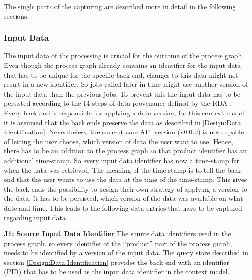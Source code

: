 \documentclass[draft,final]{vutinfth} %
\begin{document}
The single parts of the capturing are described more in detail in the following sections. 

\subsubsection{Input Data}\label{Design:Input Data}
The input data of the processing is crucial for the outcome of the process graph. Even though the process graph already contains an identifier for the input data that has to be unique for the specific back end, changes to this data might not result in a new identifier. So jobs called later in time might use another version of the input data than the previous jobs. To prevent this the input data has to be persisted according to the 14 steps of data provenance defined by the RDA \cite{rauber2016identification}. Every back end is responsible for applying a data version, for this context model it is assumed that the back ends preserve the data as described in \ref{Design:Data Identification}. Nevertheless, the current core API version (v0.0.2) is not capable of letting the user choose, which version of data the user want to use. Hence, there has to be an addition to the process graph so that product identifier has an additional time-stamp. So every input data identifier has now a time-stamp for when the data was retrieved. The meaning of the time-stamp is to tell the back end that the user wants to use the data at the time of the time-stamp. This gives the back ends the possibility to design their own strategy of applying a version to the data. It has to be persisted, which version of the data was available on what date and time. This leads to the following data entries that have to be captured regarding input data.

\textbf{J1:  Source Input Data Identifier}
The source data identifiers used in the process graph, so every identifier of the “product” part of the process graph, needs to be identified by a version of the input data. The query store described in section \ref{Design:Data Identification} provides the back end with an identifier (PID) that has to be used as the input data identifier in the context model.
\end{document}

